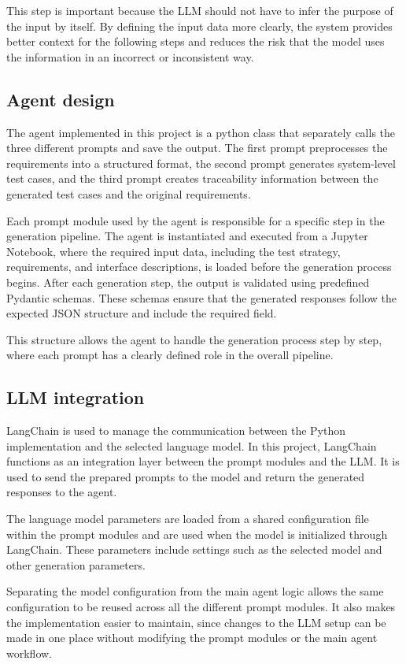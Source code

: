 \documentclass[a4paper,12pt]{article}
\begin{document}
This step is important because the LLM should not have to infer the purpose of the input by itself. By defining the input data more clearly, the system provides better context for the following steps and reduces the risk that the model uses the information in an incorrect or inconsistent way.

\subsection{Agent design}
The agent implemented in this project is a python class that separately calls the three different prompts and save the output. The first prompt preprocesses the requirements into a structured format, the second prompt generates system-level test cases, and the third prompt creates traceability information between the generated test cases and the original requirements.

Each prompt module used by the agent is responsible for a specific step in the generation pipeline. The agent is instantiated and executed from a Jupyter Notebook, where the required input data, including the test strategy, requirements, and interface descriptions, is loaded before the generation process begins. After each generation step, the output is validated using predefined Pydantic schemas. These schemas ensure that the generated responses follow the expected JSON structure and include the required field.

This structure allows the agent to handle the generation process step by step, where each prompt has a clearly defined role in the overall pipeline.

\subsection{LLM integration}
LangChain is used to manage the communication between the Python implementation and the selected language model. In this project, LangChain functions as an integration layer between the prompt modules and the LLM. It is used to send the prepared prompts to the model and return the generated responses to the agent.

The language model parameters are loaded from a shared configuration file within the prompt modules and are used when the model is initialized through LangChain. These parameters include settings such as the selected model and other generation parameters. 

Separating the model configuration from the main agent logic allows the same configuration to be reused across all the different prompt modules. It also makes the implementation easier to maintain, since changes to the LLM setup can be made in one place without modifying the prompt modules or the main agent workflow.
\end{document}
